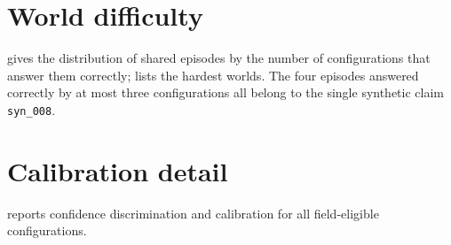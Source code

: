 \documentclass{article}
\begin{document}
{\footnotesize

}


\needspace{0.45\textheight}
\section{World difficulty}
\label{app:worlds}

 gives the distribution of shared episodes by the number of
configurations that answer them correctly;  lists the
hardest worlds. The four episodes answered correctly by at most three
configurations all belong to the single synthetic claim \texttt{syn\_008}.

\begin{table}[H]
\centering
\caption{Shared episodes by number of correct configurations.}
\label{tab:world-dist}

\end{table}

\begin{table}[H]
\centering
\small
\caption{Hardest worlds, ordered by number of correct configurations.}
\label{tab:worlds-hard}
\resizebox{\linewidth}{!}{}
\end{table}


\needspace{0.40\textheight}
\section{Calibration detail}
\label{app:calibration}

 reports confidence discrimination and calibration for
all \FieldSize{} field-eligible configurations.

\begin{table}[H]
\centering
\caption{Confidence calibration and discrimination, all configurations.}
\label{tab:calibration-full}

\end{table}
\end{document}
